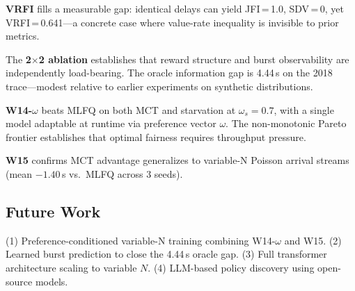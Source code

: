 \documentclass[10pt,twocolumn]{article}
\theoremstyle{remark}
\newcommand{\vrfi}{\textsc{VRFI}}
\begin{document}
\textbf{\vrfi} fills a measurable gap: identical delays can yield
JFI\,=\,1.0, SDV\,=\,0, yet \vrfi\,=\,0.641---a concrete case where
value-rate inequality is invisible to prior metrics.

The \textbf{2$\times$2 ablation} establishes that reward structure and
burst observability are independently load-bearing. The oracle
information gap is 4.44\,s on the 2018 trace---modest relative to
earlier experiments on synthetic distributions.

\textbf{W14-$\omega$} beats MLFQ on both MCT and starvation at
$\omega_s=0.7$, with a single model adaptable at runtime via
preference vector $\omega$. The non-monotonic Pareto frontier
establishes that optimal fairness requires throughput pressure.

\textbf{W15} confirms MCT advantage generalizes to variable-N Poisson
arrival streams (mean $-1.40$\,s vs.\ MLFQ across 3 seeds).

\subsection*{Future Work}

(1) Preference-conditioned variable-N training combining W14-$\omega$
and W15. (2) Learned burst prediction to close the 4.44\,s oracle
gap. (3) Full transformer architecture scaling to variable $N$.
(4) LLM-based policy discovery using open-source models.
\end{document}
